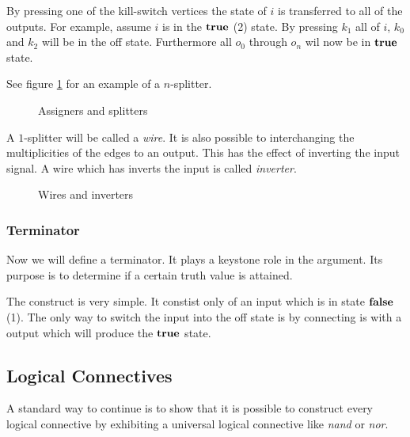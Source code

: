 By pressing one of the kill-switch vertices the state of $i$ is transferred to
all of the outputs. For example, assume $i$ is in the $\text{\bf true}$ (2) state. By
pressing $k_{1}$ all of $i$, $k_{0}$ and $k_{2}$ will be in the off state. 
Furthermore all $o_{0}$ through $o_{n}$ wil now be in $\text{\bf true}$ state.

See figure \ref{figure:constructsA} for an example of a $n$-splitter.
\begin{figure}
	\begin{center}
	\end{center}
	\caption{Assigners and splitters}\label{figure:constructsA}
\end{figure}

A $1$-splitter will be called a \emph{wire}. It is also possible to 
interchanging the multiplicities of the edges to an output. This has the effect
of inverting the input signal. A wire which has inverts the input is called
\emph{inverter}.
\begin{figure}
	\begin{center}
	\end{center}
	\caption{Wires and inverters}\label{figure:constructsB}
\end{figure}

\subsubsection{Terminator}

Now we will define a terminator. It plays a keystone role in the argument. Its
purpose is to determine if a certain truth value is attained.

The construct is very simple. It constist only of an input which is in state 
${\text{\bf false}}$ (1). The only way to switch the input into the off state is by connecting
is with a output which will produce the $\text{\bf true}$ state.

\subsection{Logical Connectives}

A standard way to continue is to show that it is possible to construct
every logical connective by exhibiting a universal logical connective
like \emph{nand} or \emph{nor}.

